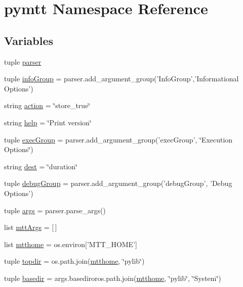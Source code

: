 \hypertarget{namespacepymtt}{\section{pymtt Namespace Reference}
\label{namespacepymtt}
}
\subsection*{Variables}
\begin{DoxyCompactItemize}
\item 
tuple \hyperlink{namespacepymtt_a95d54fdad48aac280be9d57cf81dee68}{parser}
\item 
tuple \hyperlink{namespacepymtt_a99ad2929ecc4e17f97670bed44f08c35}{info\-Group} = parser.\-add\-\_\-argument\-\_\-group('Info\-Group','Informational Options')
\item 
string \hyperlink{namespacepymtt_a5ee564a034624d925bb8dc823d11c522}{action} = \char`\"{}store\-\_\-true\char`\"{}
\item 
string \hyperlink{namespacepymtt_a21e88c39af91deb569da20633d245b09}{help} = \char`\"{}Print version\char`\"{}
\item 
tuple \hyperlink{namespacepymtt_a0f52dbd5d46583e466305a708dea64a1}{exec\-Group} = parser.\-add\-\_\-argument\-\_\-group('exec\-Group', \char`\"{}Execution Options\char`\"{})
\item 
string \hyperlink{namespacepymtt_a9ecea46ee6082edb9bbdd8393829e18e}{dest} = \char`\"{}duration\char`\"{}
\item 
tuple \hyperlink{namespacepymtt_af066a010075617c13a5595243ceb9041}{debug\-Group} = parser.\-add\-\_\-argument\-\_\-group('debug\-Group', 'Debug Options')
\item 
tuple \hyperlink{namespacepymtt_af7633cc372f3357c4f8e6f8dedfe7a8e}{args} = parser.\-parse\-\_\-args()
\item 
list \hyperlink{namespacepymtt_a906126cc10dd5691df7385d56e802d40}{mtt\-Args} = \mbox{[}$\,$\mbox{]}
\item 
list \hyperlink{namespacepymtt_a109ef76f074b08666398bf6a38219cfc}{mtthome} = os.\-environ\mbox{[}'M\-T\-T\-\_\-\-H\-O\-M\-E'\mbox{]}
\item 
tuple \hyperlink{namespacepymtt_ac673c895b8c93a029d2a1655c04af315}{topdir} = os.\-path.\-join(\hyperlink{namespacepymtt_a109ef76f074b08666398bf6a38219cfc}{mtthome}, \char`\"{}pylib\char`\"{})
\item 
tuple \hyperlink{namespacepymtt_a57729393cfbd99464570d7fa5ad9fa05}{basedir} = args.\-basediroros.\-path.\-join(\hyperlink{namespacepymtt_a109ef76f074b08666398bf6a38219cfc}{mtthome}, \char`\"{}pylib\char`\"{}, \char`\"{}System\char`\"{})

\end{DoxyCompactItemize}
